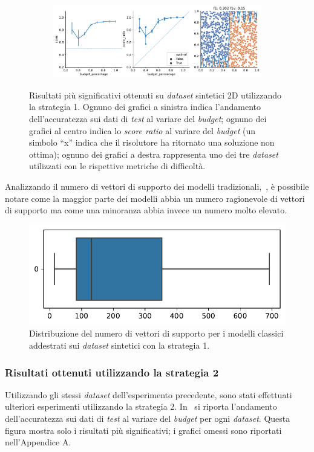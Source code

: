 \begin{figure}
\begin{subfigure}{.5\textwidth}
    \end{subfigure}%
    \hfill
    \begin{subfigure}{.5\textwidth}
        \centering
        \includegraphics[width=\textwidth]{img/2d/15.pdf}
    \end{subfigure}%
    \caption[Risultati su \emph{dataset} sintetici utilizzando la strategia 1.]{Risultati più significativi ottenuti su \emph{dataset} sintetici 2D utilizzando la strategia 1. Ognuno dei grafici a sinistra indica l'andamento dell'accuratezza sui dati di \emph{test} al variare del \emph{budget}; ognuno dei grafici al centro indica lo \emph{score ratio} al variare del \emph{budget} (un simbolo ``x'' indica che il risolutore ha ritornato una soluzione non ottima); ognuno dei grafici a destra rappresenta uno dei tre \emph{dataset} utilizzati con le rispettive metriche di difficoltà.}
\label{fig:risultati_2d}
\end{figure}


Analizzando il numero di vettori di supporto dei modelli tradizionali,~, è possibile notare come la maggior parte dei modelli abbia un numero ragionevole di vettori di supporto ma come una minoranza abbia invece un numero molto elevato.
\begin{figure}
    \centering
    \includegraphics[width=0.5\linewidth]{img/2d/numsv.pdf}
    \caption{Distribuzione del numero di vettori di supporto per i modelli classici addestrati sui \emph{dataset} sintetici con la strategia 1.}
    \label{fig:2d_dist_numsv}
\end{figure}

\subsubsection{Risultati ottenuti utilizzando la strategia 2}
Utilizzando gli stessi \emph{dataset} dell'esperimento precedente, sono stati effettuati ulteriori esperimenti utilizzando la strategia 2.
In~ si riporta l'andamento dell'accuratezza sui dati di \emph{test} al variare del \emph{budget} per ogni \emph{dataset}.
Questa figura mostra solo i risultati più significativi; i grafici omessi sono riportati nell'Appendice A.

